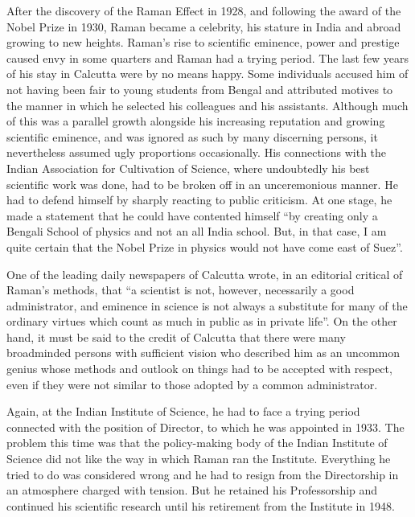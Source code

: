 After the discovery of the Raman Effect in 1928, and following the award of the Nobel Prize in 1930, Raman became a celebrity, his stature in India and abroad growing to new heights. Raman's rise to scientific eminence, power and prestige caused envy in some quarters and Raman had a trying period. The last few years of his stay in Calcutta were by no means happy. Some individuals accused him of not having been fair to young students from Bengal and attributed motives to the manner in which he selected his colleagues and his assistants. Although much of this was a parallel growth alongside his increasing reputation and growing scientific eminence, and was ignored as such by many discerning persons, it nevertheless assumed ugly proportions occasionally. His connections with the Indian Association for Cultivation of Science, where undoubtedly his best scientific work was done, had to be broken off in an unceremonious manner. He had to defend himself by sharply reacting to public criticism. At one stage, he made a statement that he could have contented himself ``by creating only a Bengali School of physics and not an all India school. But, in that case, I am quite certain that the Nobel Prize in physics would not have come east of Suez''.

One of the leading daily newspapers of Calcutta wrote, in an editorial critical of Raman's methods, that ``a scientist is not, however, necessarily a good administrator, and eminence in science is not always a substitute for many of the ordinary virtues which count as much in public as in private life''. On the other hand, it must be said to the credit of Calcutta that there were many broadminded persons with sufficient vision who described him as an uncommon genius whose methods and outlook on things had to be accepted with respect, even if they were not similar to those adopted by a common administrator.

Again, at the Indian Institute of Science, he had to face a trying period connected with the position of Director, to which he was appointed in 1933. The problem this time was that the policy-making body of the Indian Institute of Science did not like the way in which Raman ran the Institute. Everything he tried to do was considered wrong and he had to resign from the Directorship in an atmosphere charged with tension. But he retained his Professorship and continued his scientific research until his retirement from the Institute in 1948.

